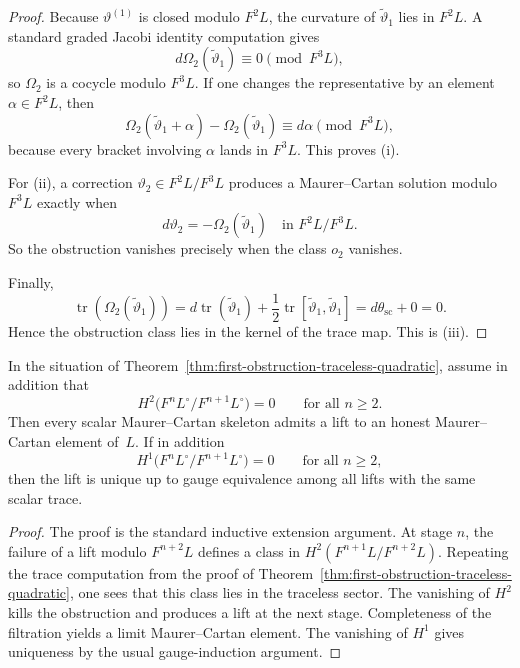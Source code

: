 \begin{proof}
Because \(\vartheta^{(1)}\) is closed modulo \(F^2L\), the curvature of
\(\widetilde\vartheta_1\) lies in \(F^2L\). A standard graded Jacobi
identity computation gives
\[
 d\Omega_2(\widetilde\vartheta_1)
 \equiv 0
 \pmod{F^3L},
\]
so \(\Omega_2\) is a cocycle modulo \(F^3L\). If one changes the
representative by an element \(\alpha\in F^2L\), then
\[
\Omega_2(\widetilde\vartheta_1+\alpha)
-
\Omega_2(\widetilde\vartheta_1)
\equiv d\alpha
\pmod{F^3L},
\]
because every bracket involving \(\alpha\) lands in \(F^3L\). This
proves \textup{(i)}.

For \textup{(ii)}, a correction
\(\vartheta_2\in F^2L/F^3L\) produces a Maurer--Cartan solution modulo
\(F^3L\) exactly when
\[
 d\vartheta_2 = -\Omega_2(\widetilde\vartheta_1)
 \quad \text{in }F^2L/F^3L.
\]
So the obstruction vanishes precisely when the class \(o_2\) vanishes.

Finally,
\[
\operatorname{tr}(\Omega_2(\widetilde\vartheta_1))
=
d\operatorname{tr}(\widetilde\vartheta_1)
+\frac12\operatorname{tr}[\widetilde\vartheta_1,\widetilde\vartheta_1]
=
d\theta_{\mathrm{sc}}+0=0.
\]
Hence the obstruction class lies in the kernel of the trace map. This
is \textup{(iii)}.
\end{proof}

\begin{corollary}
\label{cor:filtered-lift-vanishing}
In the situation of
Theorem~\ref{thm:first-obstruction-traceless-quadratic}, assume in
addition that
\[
H^2\bigl(F^nL^\circ/F^{n+1}L^\circ\bigr)=0
\qquad\text{for all }n\geq 2.
\]
Then every scalar Maurer--Cartan skeleton admits a lift to an honest
Maurer--Cartan element of~\(L\). If in addition
\[
H^1\bigl(F^nL^\circ/F^{n+1}L^\circ\bigr)=0
\qquad\text{for all }n\geq 2,
\]
then the lift is unique up to gauge equivalence among all lifts with the
same scalar trace.
\end{corollary}

\begin{proof}
The proof is the standard inductive extension argument. At stage
\(n\), the failure of a lift modulo \(F^{n+2}L\) defines a class in
\(H^2(F^{n+1}L/F^{n+2}L)\). Repeating the trace computation from the
proof of
Theorem~\ref{thm:first-obstruction-traceless-quadratic}, one sees that
this class lies in the traceless sector. The vanishing of
\(H^2\) kills the obstruction and produces a lift at the next stage.
Completeness of the filtration yields a limit Maurer--Cartan element.
The vanishing of \(H^1\) gives uniqueness by the usual gauge-induction
argument.
\end{proof}

